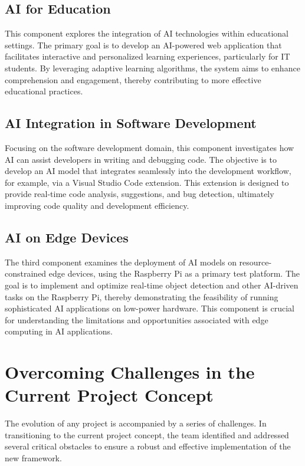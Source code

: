 \subsection{AI for Education}

This component explores the integration of AI technologies within educational settings. The primary goal is to develop an AI-powered web application that facilitates interactive and personalized learning experiences, particularly for IT students. By leveraging adaptive learning algorithms, the system aims to enhance comprehension and engagement, thereby contributing to more effective educational practices.

\subsection{AI Integration in Software Development}

Focusing on the software development domain, this component investigates how AI can assist developers in writing and debugging code. The objective is to develop an AI model that integrates seamlessly into the development workflow, for example, via a Visual Studio Code extension. This extension is designed to provide real-time code analysis, suggestions, and bug detection, ultimately improving code quality and development efficiency.

\subsection{AI on Edge Devices}

The third component examines the deployment of AI models on resource-constrained edge devices, using the Raspberry Pi as a primary test platform. The goal is to implement and optimize real-time object detection and other AI-driven tasks on the Raspberry Pi, thereby demonstrating the feasibility of running sophisticated AI applications on low-power hardware. This component is crucial for understanding the limitations and opportunities associated with edge computing in AI applications.


\section{Overcoming Challenges in the Current Project Concept}

The evolution of any project is accompanied by a series of challenges. In transitioning to the current project concept, the team identified and addressed several critical obstacles to ensure a robust and effective implementation of the new framework.

